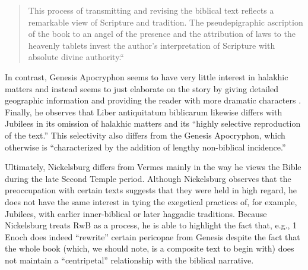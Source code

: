 \begin{quote}
This process of transmitting and revising the biblical text reflects a
remarkable view of Scripture and tradition. The pseudepigraphic
ascription of the book to an angel of the presence and the attribution
of laws to the heavenly tablets invest the author's interpretation of
Scripture with absolute divine
authority.``\autocite[101]{nickelsburg_stone1984}
\end{quote}

In contrast, Genesis Apocryphon seems to have very little interest in
halakhic matters and instead seems to just elaborate on the story by
giving detailed geographic information and providing the reader with
more dramatic characters \autocite[106]{nickelsburg_stone1984}. Finally,
he observes that Liber antiquitatum biblicarum likewise differs with
Jubilees in its omission of halakhic matters and its ``highly selective
reproduction of the text.''\autocite[110]{nickelsburg_stone1984} This
selectivity also differs from the Genesis Apocryphon, which otherwise is
``characterized by the addition of lengthy non-biblical
incidence.''\autocite[110]{nickelsburg_stone1984}

Ultimately, Nickelsburg differs from Vermes mainly in the way he views
the Bible during the late Second Temple period. Although Nickelsburg
observes that the preoccupation with certain texts suggests that they
were held in high regard, he does not have the same interest in tying
the exegetical practices of, for example, Jubilees, with earlier
inner-biblical or later haggadic traditions. Because Nickelsburg treats
RwB as a process, he is able to highlight the fact that, e.g., 1 Enoch
does indeed ``rewrite'' certain pericopae from Genesis despite the fact
that the whole book (which, we should note, is a composite text to begin
with) does not maintain a ``centripetal'' relationship with the biblical
narrative.


